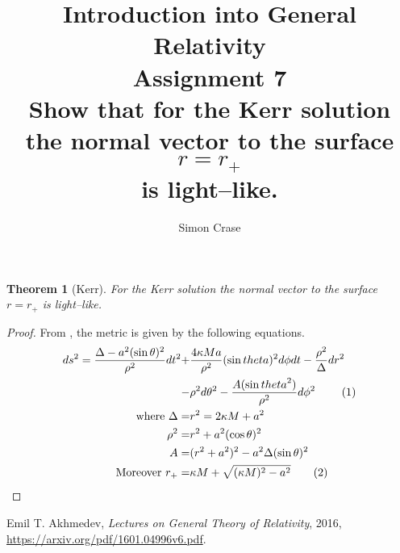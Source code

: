\documentclass[]{article}
\title{Introduction into General Relativity\\Assignment 7\\Show that for the Kerr solution\\the normal vector to the surface $r=r_+$\\is light--like.}
\author{Simon Crase}
\newtheorem{theorem}{Theorem}
\newcommand\numberthis{\addtocounter{equation}{1}\tag{\theequation}}
\begin{document}
\maketitle

\begin{theorem}[Kerr]
	For the Kerr solution the normal vector to the surface $r=r_+$ is light--like.
\end{theorem}

\begin{proof}
	From \cite[Lecture VII,5,(174)]{akhmedev2016}, the metric is given by the following equations.
	\begin{align*}
	ds^2 = \frac{\Delta-a^2 (\sin{\theta})^2}{\rho^2}dt^2 +& \frac{4 \kappa M a}{\rho^2}(\sin{theta})^2 d\phi dt - \frac{\rho^2}{\Delta} dr^2\\
	-&\rho^2 d\theta^2 - \frac{A (\sin{theta}^2)}{\rho^2} d\phi^2\ \numberthis\\
	\text{where } \Delta =& r^2 = 2 \kappa M + a^2\\
	\rho^2 =& r^2 + a^2 (\cos{\theta})^2\\
	A =& (r^2+a^2)^2 - a^2 \Delta (\sin{\theta})^2 \\
	\text{Moreover } r_{+} = & \kappa M + \sqrt{(\kappa M)^2 - a^2} \numberthis
	\end{align*}
\end{proof}


\begin{thebibliography}{9}
	
	Emil T. Akhmedev,
	\emph{Lectures on General Theory of Relativity},
	2016,
	\url{https://arxiv.org/pdf/1601.04996v6.pdf}.
	
\end{thebibliography}
\end{document}

